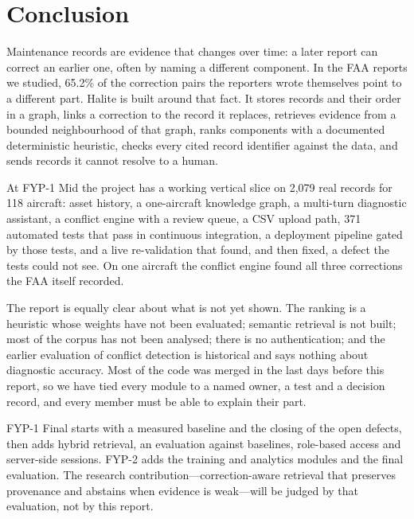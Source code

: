 \chapter{Conclusion}\label{ch:conclusion}
Maintenance records are evidence that changes over time: a later report can correct an earlier one, often by naming a different component. In the FAA reports we studied, 65.2\% of the correction pairs the reporters wrote themselves point to a different part. Halite is built around that fact. It stores records and their order in a graph, links a correction to the record it replaces, retrieves evidence from a bounded neighbourhood of that graph, ranks components with a documented deterministic heuristic, checks every cited record identifier against the data, and sends records it cannot resolve to a human.

At FYP-1 Mid the project has a working vertical slice on 2,079 real records for 118 aircraft: asset history, a one-aircraft knowledge graph, a multi-turn diagnostic assistant, a conflict engine with a review queue, a CSV upload path, 371 automated tests that pass in continuous integration, a deployment pipeline gated by those tests, and a live re-validation that found, and then fixed, a defect the tests could not see. On one aircraft the conflict engine found all three corrections the FAA itself recorded.

The report is equally clear about what is not yet shown. The ranking is a heuristic whose weights have not been evaluated; semantic retrieval is not built; most of the corpus has not been analysed; there is no authentication; and the earlier evaluation of conflict detection is historical and says nothing about diagnostic accuracy. Most of the code was merged in the last days before this report, so we have tied every module to a named owner, a test and a decision record, and every member must be able to explain their part.

FYP-1 Final starts with a measured baseline and the closing of the open defects, then adds hybrid retrieval, an evaluation against baselines, role-based access and server-side sessions. FYP-2 adds the training and analytics modules and the final evaluation. The research contribution---correction-aware retrieval that preserves provenance and abstains when evidence is weak---will be judged by that evaluation, not by this report.
